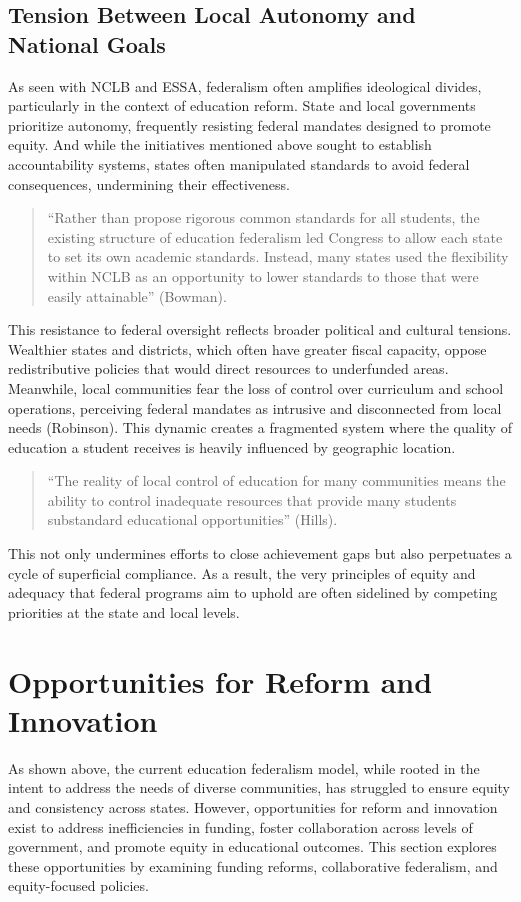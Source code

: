 \documentclass[11pt]{extarticle}
\begin{document}
\subsection{Tension Between Local Autonomy and National Goals}
As seen with NCLB and ESSA, federalism often amplifies ideological divides, particularly in the context of education reform. State and local governments prioritize autonomy, frequently resisting federal mandates designed to promote equity. And while the initiatives mentioned above sought to establish accountability systems, states often manipulated standards to avoid federal consequences, undermining their effectiveness.
\begin{quote}
  ``Rather than propose rigorous common standards for all students, the existing structure of education federalism led Congress to allow each state to set its own academic standards. Instead, many states used the flexibility within NCLB as an opportunity to lower standards to those that were easily attainable” (Bowman).
\end{quote}
This resistance to federal oversight reflects broader political and cultural tensions. Wealthier states and districts, which often have greater fiscal capacity, oppose redistributive policies that would direct resources to underfunded areas. Meanwhile, local communities fear the loss of control over curriculum and school operations, perceiving federal mandates as intrusive and disconnected from local needs (Robinson). This dynamic creates a fragmented system where the quality of education a student receives is heavily influenced by geographic location.
\begin{quote}
``The reality of local control of education for many communities means the ability to control inadequate resources that provide many students substandard educational opportunities'' (Hills).
\end{quote}
This not only undermines efforts to close achievement gaps but also perpetuates a cycle of superficial compliance. As a result, the very principles of equity and adequacy that federal programs aim to uphold are often sidelined by competing priorities at the state and local levels.








\section{Opportunities for Reform and Innovation}
As shown above, the current education federalism model, while rooted in the intent to address the needs of diverse communities, has struggled to ensure equity and consistency across states. However, opportunities for reform and innovation exist to address inefficiencies in funding, foster collaboration across levels of government, and promote equity in educational outcomes. This section explores these opportunities by examining funding reforms, collaborative federalism, and equity-focused policies.
\end{document}
